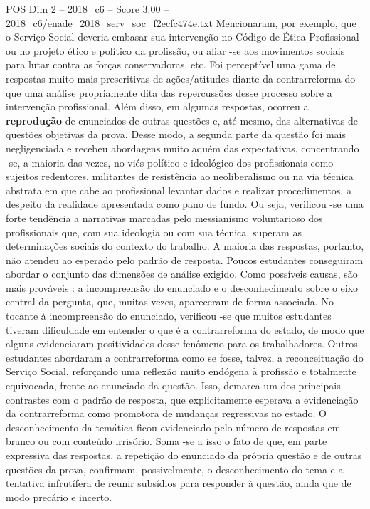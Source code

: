 \begin{textsample}{POS Dim 2 – 2018\_c6 – Score 3.00 – 2018\_c6/enade\_2018\_serv\_soc\_f2ecfc474e.txt}
Mencionaram, por exemplo, que o Serviço Social deveria embasar sua intervenção no Código de Ética Profissional ou no projeto ético e político da profissão, ou aliar -se aos movimentos sociais para lutar contra as forças conservadoras, etc.
Foi perceptível uma gama de respostas muito mais prescritivas de ações/atitudes diante da contrarreforma do que uma análise propriamente dita das repercussões desse processo sobre a intervenção profissional.
Além disso, em algumas respostas, ocorreu a \textbf{reprodução} de enunciados de outras questões e, até mesmo, das alternativas de questões objetivas da prova.
Desse modo, a segunda parte da questão foi mais negligenciada e recebeu abordagens muito aquém das expectativas, concentrando -se, a maioria das vezes, no viés político e ideológico dos profissionais como sujeitos redentores, militantes de resistência ao neoliberalismo ou na via técnica abstrata em que cabe ao profissional levantar dados e realizar procedimentos, a despeito da realidade apresentada como pano de fundo.
Ou seja, verificou -se uma forte tendência a narrativas marcadas pelo messianismo voluntarioso dos profissionais que, com sua ideologia ou com sua técnica, superam as determinações sociais do contexto do trabalho.
A maioria das respostas, portanto, não atendeu ao esperado pelo padrão de resposta.
Poucos estudantes conseguiram abordar o conjunto das dimensões de análise exigido.
Como possíveis causas, são mais prováveis : a incompreensão do enunciado e o desconhecimento sobre o eixo central da pergunta, que, muitas vezes, apareceram de forma associada.
No tocante à incompreensão do enunciado, verificou -se que muitos estudantes tiveram dificuldade em entender o que é a contrarreforma do estado, de modo que alguns evidenciaram positividades desse fenômeno para os trabalhadores.
Outros estudantes abordaram a contrarreforma como se fosse, talvez, a reconceituação do Serviço Social, reforçando uma reflexão muito endógena à profissão e totalmente equivocada, frente ao enunciado da questão.
Isso, demarca um dos principais contrastes com o padrão de resposta, que explicitamente esperava a evidenciação da contrarreforma como promotora de mudanças regressivas no estado.
O desconhecimento da temática ficou evidenciado pelo número de respostas em branco ou com conteúdo irrisório.
Soma -se a isso o fato de que, em parte expressiva das respostas, a repetição do enunciado da própria questão e de outras questões da prova, confirmam, possivelmente, o desconhecimento do tema e a tentativa infrutífera de reunir subsídios para responder à questão, ainda que de modo precário e incerto.

\end{textsample}

